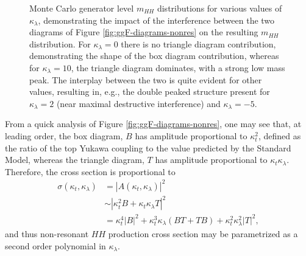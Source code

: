 \begin{figure}[ht]
\centering
{}
\caption{\label{fig:kl-shapes} Monte Carlo generator level $m_{HH}$ distributions for various values of 
$\kappa_{\lambda}$, demonstrating the impact of the interference between the two diagrams of Figure \ref{fig:ggF-diagrams-nonres} 
on the resulting $m_{HH}$ distribution. For $\kappa_{\lambda} = 0$ there is no triangle diagram contribution, 
demonstrating the shape of the box diagram contribution, whereas for $\kappa_{\lambda}=10$, the triangle diagram 
dominates, with a strong low mass peak. The interplay between the two is quite evident for other values, resulting in, 
e.g., the double peaked structure present for $\kappa_{\lambda} = 2$ (near maximal destructive interference) and $\kappa_{\lambda}=-5$. ~\cite{HDBS-2018-58}}
\end{figure}

From a quick analysis of Figure \ref{fig:ggF-diagrams-nonres}, one may see that, at leading order, the box diagram, $B$ 
has amplitude proportional to $\kappa_{t}^2$, defined as the ratio of the top Yukawa coupling to the value 
predicted by the Standard Model, whereas the triangle diagram, $T$ has amplitude proportional to 
$\kappa_{t}\kappa_{\lambda}$. Therefore, the cross section is proportional to 
\begin{align}
\sigma(\kappa_{t}, \kappa_{\lambda}) &= |A(\kappa_{t}, \kappa_{\lambda})|^2 \\
&\sim |\kappa_{t}^2B +\kappa_{t}\kappa_{\lambda}T|^2\\
&= \kappa_{t}^4|B|^2 + \kappa_{t}^3\kappa_{\lambda}(BT+TB) + \kappa_{t}^2\kappa_{\lambda}^2|T|^2,
\end{align} 
and thus non-resonant $HH$ production cross section may be parametrized as a second order 
polynomial in $\kappa_{\lambda}$.

